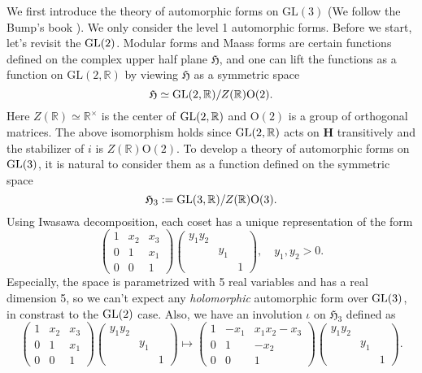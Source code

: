 We first introduce the theory of automorphic forms on $\mathrm{GL}(3)$ (We follow the Bump's book \cite{bump2006automorphic}).
We only consider the level 1 automorphic forms.
Before we start, let's revisit the $\operatorname{\mathrm{GL}}(2)$.
Modular forms and Maass forms are certain functions defined on the complex upper half plane $\mathfrak{H}$, and one can lift the functions as a function on $\mathrm{GL}(2, \mathbb{R})$ by viewing $\mathfrak{H}$ as a symmetric space
$$
\mathfrak{H} \simeq  \operatorname{\mathrm{GL}}(2, \mathbb{R})/Z(\mathbb{R})\mathrm{O}(2).
$$
Here $Z(\mathbb{R}) \simeq \mathbb{R}^{\times}$ is the center of $\operatorname{\mathrm{GL}}(2, \mathbb{R})$ and $\mathrm{O}(2)$ is a group of orthogonal matrices. 
The above isomorphism holds since $\operatorname{\mathrm{GL}}(2, \mathbb{R})$ acts on $\mathbf{H}$ transitively and the stabilizer of $i$ is $Z(\mathbb{R})\mathrm{O}(2)$.
To develop a theory of automorphic forms on $\operatorname{\mathrm{GL}}(3)$, it is natural to consider them as a function defined on the symmetric space 
$$
    \mathfrak{H}_{3} := \operatorname{\mathrm{GL}}(3,\mathbb{R}) / Z(\mathbb{R})\mathrm{O}(3).
$$
Using Iwasawa decomposition, each coset has a unique representation of the form 
$$
\begin{pmatrix} 1 & x_{2} & x_{3} \\ 0 & 1 & x_{1} \\ 0 & 0 & 1 \end{pmatrix} \begin{pmatrix}
y_{1}y_{2} & & \\ & y_{1} & \\ & & 1
\end{pmatrix}, \quad y_{1}, y_{2} > 0.
$$
Especially, the space is parametrized with 5 real variables and has a real dimension 5, so we can't expect any \emph{holomorphic} automorphic form over $\operatorname{\mathrm{GL}}(3)$, in constrast to the $\operatorname{\mathrm{GL}}(2)$ case.
Also, we have an involution $\iota$ on $\mathfrak{H}_{3}$ defined as 
$$
\begin{pmatrix} 1 & x_{2} & x_{3} \\ 0 & 1 & x_{1} \\ 0 & 0 & 1 \end{pmatrix} \begin{pmatrix}
y_{1}y_{2} & & \\ & y_{1} & \\ & & 1
\end{pmatrix} \mapsto
\begin{pmatrix} 1 & -x_{1} & x_{1}x_{2} - x_{3} \\ 0 & 1 & -x_{2} \\ 0 & 0 & 1 \end{pmatrix} \begin{pmatrix}
y_{1}y_{2} & & \\ & y_{1} & \\ & & 1
\end{pmatrix}.
$$
